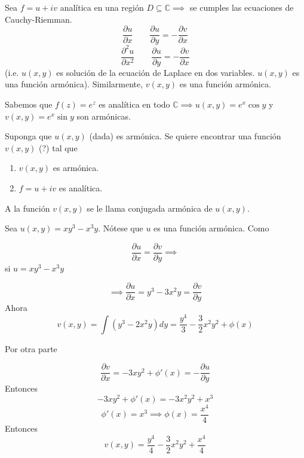 \begin{nota}
    Sea $f=u+iv$ analítica en una región $D\subseteq\mathbb{C}\implies $ se cumples las ecuaciones de Cauchy-Riemman.
    $$\frac{\partial u}{\partial x}\qquad \frac{\partial u}{\partial y}=-\frac{\partial v}{\partial x}$$
    $$\frac{\partial^2 u}{\partial x^2}\qquad \frac{\partial u}{\partial y}=-\frac{\partial v}{\partial x}$$ (i.e. $u(x,y)$ es solución de la ecuación de Laplace en dos variables. $u(x,y)$ es una función armónica). Similarmente, $v(x,y)$ es una función armónica. 
\end{nota}

\begin{ejemplo}
    Sabemos que $f(z)=e^z$ es analítica en todo $\mathbb{C}\implies u(x,y)=e^x\cos y$ y $v(x,y)=e^x\sin y$ son armónicas. 
\end{ejemplo}

\begin{nota}
    Suponga que $u(x,y)$ (dada) es armónica. Se quiere encontrar una función $v(x,y)$ (?) tal que \begin{enumerate}
        \item $v(x,y)$ es armónica. 
        \item $f=u+iv$ es analítica. 
    \end{enumerate} 
    A la función $v(x,y)$ se le llama conjugada armónica de $u(x,y)$.
\end{nota}

\begin{ejemplo}
    Sea $u(x,y)=xy^3-x^3y$. Nótese que $u$ es una función armónica. Como 

    $$\frac{\partial u}{\partial x}=\frac{\partial v}{\partial y}\implies$$
    si $u=xy^3-x^3y$

    $$\implies \frac{\partial u}{\partial x}=y^3-3x^2y=\frac{\partial v}{\partial y}$$
    Ahora 
    $$v(x,y)=\int (y^3-2x^2y)dy = \frac{y^4}{3}-\frac{3}{2}x^2y^2+\phi(x)$$

    Por otra parte 

    $$\frac{\partial v}{\partial x}=-3xy^2 +\phi'(x)=-\frac{\partial u}{\partial y}$$
    Entonces 
    $$-3xy^2+\phi'(x)=-3x^2y^2+x^3$$
    $$\phi'(x)=x^3\implies \phi(x)=\frac{x^4}{4}$$
    Entonces 
    $$v(x,y)=\frac{y^4}{4}-\frac{3}{2}x^2y^2+\frac{x^4}{4}$$
\end{ejemplo}